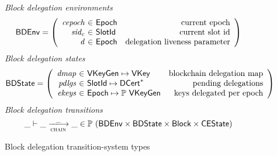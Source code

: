 \documentclass[11pt,a4paper]{article}
\newcommand{\powerset}[1]{\mathbb{P}~#1}
\newcommand{\var}[1]{\mathit{#1}}
\newcommand{\type}[1]{\mathsf{#1}}
\newcommand{\trans}[2]{\xlongrightarrow[\textsc{#1}]{#2}}
\newcommand{\seqof}[1]{#1^{*}}
\newcommand{\VKey}{\type{VKey}}
\newcommand{\DCert}{\type{DCert}}
\newcommand{\Epoch}{\type{Epoch}}
\newcommand{\VKeyGen}{\type{VKeyGen}}
\newcommand{\Block}{\type{Block}}
\newcommand{\SlotId}{\type{SlotId}}
\newcommand{\CEState}{\type{CEState}}
\newcommand{\BDEnv}{\type{BDEnv}}
\newcommand{\BDState}{\type{BDState}}
\begin{document}
\begin{figure}
  \emph{Block delegation environments}
  \begin{equation*}
    \BDEnv =
    \left(
      \begin{array}{r@{~\in~}lr}
        \var{cepoch} & \Epoch & \text{current epoch}\\
        \var{sid_c} & \SlotId & \text{current slot id}\\
        \var{d} & \Epoch & \text{delegation liveness parameter}\\
      \end{array}
    \right)
  \end{equation*}
  \emph{Block delegation states}
  \begin{equation*}
    \BDState =
    \left(
      \begin{array}{r@{~\in~}lr}
        \var{dmap} & \VKeyGen \mapsto \VKey & \text{blockchain delegation map}\\
        \var{pdlgs} & \SlotId \mapsto \seqof{\DCert} & \text{pending delegations}\\
        \var{ekeys} & \Epoch \mapsto \powerset{\VKeyGen} & \text{keys delegated per epoch}
      \end{array}
    \right)
  \end{equation*}
  \emph{Block delegation transitions}
  \begin{equation*}
    \_ \vdash \_ \trans{chain}{\_} \_ \in
      \powerset (\BDEnv \times \BDState \times \Block \times \CEState)
  \end{equation*}
  \caption{Block delegation transition-system types}
  \label{fig:block-delegation-ts-types}
\end{figure}
\end{document}
